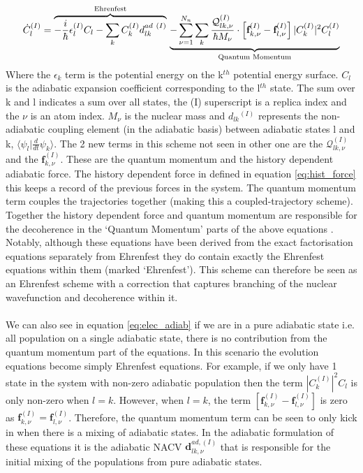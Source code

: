 \begin{dmath}
  \dot{C}_{l}^{(I)} =
  \overbrace{
    -\frac{i}{\hbar} \epsilon_l^{(I)} C_{l}
    - \sum_k C_k^{(I)} d_{lk}^{ad \ (I)}
  }^{\text{Ehrenfest}}
  \\
  \underbrace{
    - \sum_{\nu=1}^{N_n}\sum_{k} \frac{\mathcal{Q}_{lk, \nu}^{(I)}}{\hbar M_\nu} \cdot \left[ \textbf{f}_{k,\nu}^{(I)} - \textbf{f}_{l,\nu}^{(I)} \right] |C_{k}^{(I)}|^2 C_{l}^{(I)}
  }_{\text{Quantum Momentum}}
  \label{eq:elec_adiab}
\end{dmath}
Where the $\epsilon_k$ term is the potential energy on the k$^{th}$ potential energy surface. $C_l$ is the adiabatic expansion coefficient corresponding to the l$^{th}$ state. The sum over k and l indicates a sum over all states, the (I) superscript is a replica index and the $\nu$ is an atom index. $M_{\nu}$ is the nuclear mass and $d_{lk}{^(I)}$ represents the non-adiabatic coupling element (in the adiabatic basis) between adiabatic states l and k, $\langle \psi_{l} \vert \frac{d}{dt}\psi_{k} \rangle$.
The 2 new terms in this scheme not seen in other one are the $\mathcal{Q}_{lk, \nu}^{(I)}$ and the $\textbf{f}_{k, \nu}^{(I)}$. These are the quantum momentum and the history dependent adiabatic force. The history dependent force in defined in equation \eqref{eq:hist_force} this keeps a record of the previous forces in the system. The quantum momentum term couples the trajectories together (making this a coupled-trajectory scheme). Together the history dependent force and quantum momentum are responsible for the decoherence in the `Quantum Momentum' parts of the
above equations \cite{gossel_coupled-trajectory_2018}. Notably, although these equations have been derived from the exact factorisation equations separately from Ehrenfest they do contain exactly the Ehrenfest equations within them (marked `Ehrenfest'). This scheme can therefore be seen as an Ehrenfest scheme with a correction that captures branching of the nuclear wavefunction and decoherence within it.
\\\\
We can also see in equation \eqref{eq:elec_adiab} if we are in a pure adiabatic state i.e. all population on a single adiabatic state, there is no contribution from the quantum momentum part of the equations. In this scenario the evolution equations become simply Ehrenfest equations. For example, if we only have 1 state in the system with non-zero adiabatic population then the term $|C_{k}^{(I)}|^2 C_{l}$ is only non-zero when $l = k$. However, when $l = k$, the term $\left[ \textbf{f}_{k,\nu}^{(I)} - \textbf{f}_{l,\nu}^{(I)} \right]$ is zero as $\textbf{f}_{k,\nu}^{(I)} = \textbf{f}_{l,\nu}^{(I)}$.
Therefore, the quantum momentum term can be seen to only kick in when there is a mixing of adiabatic states. In the adiabatic formulation of these equations it is the adiabatic NACV $\textbf{d}_{lk, \nu}^{ad, (I)}$ that is responsible for the initial mixing of the populations from pure adiabatic states.

